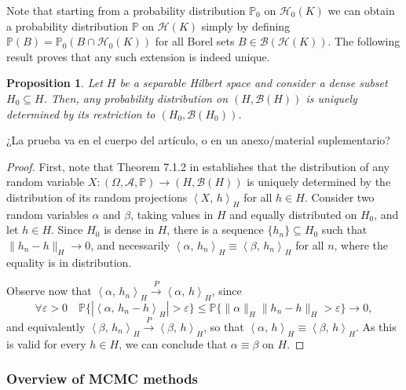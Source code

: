 \documentclass[ba]{imsart}
\numberwithin{equation}{section}
\theoremstyle{plain}
\newtheorem{prop}{Proposition}[section]
\renewcommand{\epsilon}{\varepsilon}
\newcommand\dotprod[2]{\left\langle #1,\, #2 \right\rangle}
\newenvironment{comment}
{
\noindent \em \color{red}
}
{
\color{black}
}
\begin{document}
Note that starting from a probability distribution \(\mathbb{P}_0\) on \(\mathcal H_0(K)\) we can obtain a probability distribution \(\mathbb{P}\) on \(\mathcal H(K)\) simply by defining \(\mathbb{P}(B) = \mathbb{P}_0(B\cap \mathcal H_0(K))\) for all Borel sets \(B \in \mathcal B(\mathcal H(K))\). The following result proves that any such extension is indeed unique.

\begin{prop} Let \(H\) be a separable Hilbert space and consider a dense subset \(H_0\subseteq H\). Then, any probability distribution on \((H, \mathcal{B}(H))\) is uniquely determined by its restriction to \((H_0, \mathcal B(H_0))\).
\end{prop}
\begin{comment}
    ¿La prueba va en el cuerpo del artículo, o en un anexo/material suplementario?
\end{comment}

\begin{proof}

First, note that Theorem 7.1.2 in \citet[p.~177]{hsing2015theoretical} establishes that the distribution of any random variable \(X: (\Omega, \mathcal A, \mathbb{P})\to (H, \mathcal B(H))\) is uniquely determined by the distribution of its random projections \(\dotprod{X}{h}_H\) for all \(h \in H\).
Consider two random variables \(\alpha\) and \(\beta\), taking values in \(H\) and equally distributed on \(H_0\), and let \(h \in H\). Since \(H_0\) is dense in \(H\), there is a sequence \(\{h_n\}\subseteq H_0\) such that \(\|h_n - h\|_H \to 0\), and necessarily \(\dotprod{\alpha}{h_n}_H \equiv \dotprod{\beta}{h_n}_H\) for all \(n\), where the equality is in distribution.

Observe now that \(\dotprod{\alpha}{h_n}_H \overset{P}{\to} \dotprod{\alpha}{h}_H\), since
\[
\forall \epsilon > 0 \quad \mathbb{P}\{|\dotprod{\alpha}{h_n - h}_H| > \epsilon\} \leq \mathbb{P}\{\|\alpha\|_H \|h_n - h\|_H > \epsilon\} \to 0,
\]
and equivalently \(\dotprod{\beta}{h_n}_H \overset{P}{\to} \dotprod{\beta}{h}_H\), so that \(\dotprod{\alpha}{h}_H \equiv \dotprod{\beta}{h}_H\). As this is valid for every \(h \in H\), we can conclude that \(\alpha \equiv \beta\) on \(H\).
\end{proof}

\subsubsection{Overview of MCMC methods}
\end{document}
